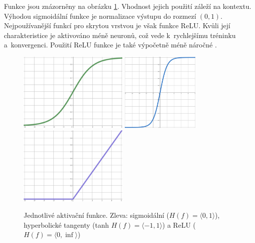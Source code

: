 Funkce jsou znázorněny na obrázku \ref{aktivacni_funkce}. Vhodnost jejich použití záleží na kontextu. Výhodou sigmoidální funkce je normalizace výstupu do rozmezí $(0,1)$. Nejpoužívanější funkcí pro skrytou vrstvou je však funkce ReLU. Kvůli její charakteristice je aktivováno méně neuronů, což vede k~rychlejšímu tréninku a~konvergenci. Použití ReLU funkce je také výpočetně méně náročné \cite{medium:activation_function}.

\begin{figure}[hbt]
    \centering
	    \includegraphics[width=0.33\linewidth, height=1.5in]{obrazky/sigmoid.pdf}\hfill
    	\includegraphics[width=0.33\linewidth, height=1.5in]{obrazky/tanh.pdf}\hfill
    	\includegraphics[width=0.33\linewidth, height=1.5in]{obrazky/relu.pdf}\hfill
	\caption{Jednotlivé aktivační funkce. Zleva: sigmoidální ($H(f)=\langle 0,1 \rangle$), hyperbolické tangenty (tanh $H(f)=\langle -1,1 \rangle$) a ReLU ($H(f)=\langle 0,\inf \rangle$)}
	\label{aktivacni_funkce}
\end{figure}



